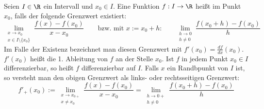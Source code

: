 Seien $I \in \R$ ein Intervall und $x_0 \in I$. Eine Funktion $f: I \to \R$ heißt  im Punkt $x_0$, falls der folgende Grenzwert existiert:
$$\lim_{\substack{x \to x_0 \\ x \in I \setminus \{x_0\}}} \frac{f(x)-f(x_0)}{x-x_0} \qquad \text{bzw. mit $x := x_0 + h$:} \qquad \lim_{\substack{h \to 0 \\ h \neq 0}} \frac{f(x_0 + h) - f(x_0)}{h}$$
Im Falle der Existenz bezeichnet man diesen Grenzwert mit $f'(x_0) = \frac{df}{dx}(x_0)$. $f'(x_0)$ heißt die 1. Ableitung von $f$ an der Stelle $x_0$. Ist $f$ in  jedem Punkt $x_0 \in I$ differenzierbar, so heißt $f$ differenzierbar auf $I$. Falls $x$ ein Randbpunkt von $I$ ist, so versteht man den obigen Grenzwert als links- oder rechtsseitigen Grenzwert:
$$f'_+(x_0) := \lim_{\substack{x \to x_{0+} \\ x \neq x_0}} \frac{f(x)-f(x_0)}{x-x_0} = \lim_{\substack{h \to 0+ \\ h \neq 0}} \frac{f(x_0+h)-f(x_0)}{h}$$